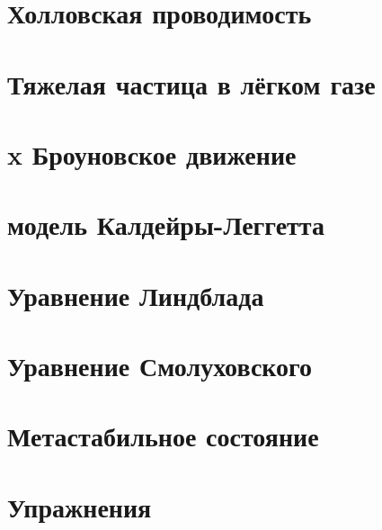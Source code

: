 
\setcounter{section}{9}
\section{Холловская проводимость}



\setcounter{section}{11}
\section{Тяжелая частица в лёгком газе}


% 

\setcounter{section}{13}
\section{x Броуновское движение}


\setcounter{section}{14}
\section{модель Калдейры-Леггетта}



\setcounter{section}{15}
\section{Уравнение Линдблада}



\setcounter{section}{16}
\section{Уравнение Смолуховского}



\setcounter{section}{17}
\section{Метастабильное состояние}







\setcounter{section}{19}
\section{Упражнения}

